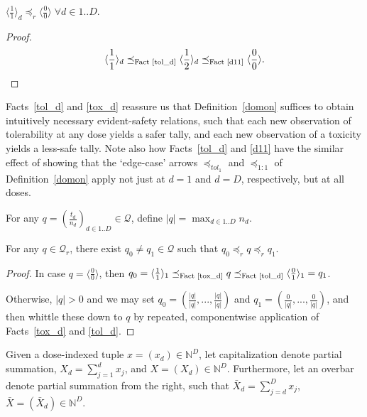 \documentclass{article}
\newcommand{\N}{\mathbb{N}}
\newcommand{\Q}{\ensuremath{\mathcal{Q}}}
\begin{document}
\begin{fact}\label{tox_d}
  $\langle\frac{1}{1}\rangle_d \preceq_r \langle\frac{0}{0}\rangle \;\forall d\in 1..D$.
\end{fact}
\begin{proof}
  $$
  \langle\frac{1}{1}\rangle_d \preceq_\text{Fact~\ref{tol_d}} \langle\frac{1}{2}\rangle_d \preceq_\text{Fact~\ref{d11}} \langle\frac{0}{0}\rangle.
  $$
\end{proof}

Facts~\ref{tol_d} and \ref{tox_d} reassure us that Definition~\ref{domon} suffices to obtain intuitively necessary evident-safety relations, such that each new observation of tolerability at any dose yields a safer tally, and each new observation of a toxicity yields a less-safe tally.  Note also how Facts~\ref{tol_d} and \ref{d11} have the similar effect of showing that the `edge-case' arrows $\preceq_{tol_1}$ and $\preceq_{1:1}$ of Definition~\ref{domon} apply not just at $d=1$ and $d=D$, respectively, but at all doses.

\begin{nota}
  For any $q = (\frac{t_d}{n_d})_{d\in 1..D} \in \Q$, define $|q| = \max_{d\in 1..D} n_d$.
\end{nota}

\begin{lemma}
  For any $q \in \Q_r$, there exist $q_0 \neq q_1 \in \Q$ such that $q_0 \preceq_r q \preceq_r q_1$.
\end{lemma}
\begin{proof}
  In case $q = \langle\frac{0}{0}\rangle$, then $q_0 = \langle\frac{1}{1}\rangle_1  \preceq_\text{Fact~\ref{tox_d}} q \preceq_\text{Fact~\ref{tol_d}} \langle\frac{0}{1}\rangle_1 = q_1$.

  Otherwise, $|q| >0$ and we may set $q_0 = (\frac{|q|}{|q|},...,\frac{|q|}{|q|})$ and $q_1 = (\frac{0}{|q|},...,\frac{0}{|q|})$, and then whittle these down to $q$ by repeated, componentwise application of Facts~\ref{tox_d} and \ref{tol_d}.
\end{proof}

\begin{nota}
  Given a dose-indexed tuple $x = (x_d) \in \N^D$, let capitalization denote partial summation, $X_d = \sum_{j=1}^d x_j$, and $X = (X_d) \in \N^D$.  Furthermore, let an overbar denote partial summation from the right, such that $\bar{X}_d = \sum_{j=d}^D x_j$, $\bar{X} = (\bar{X}_d) \in \N^D$.
\end{nota}
\end{document}
